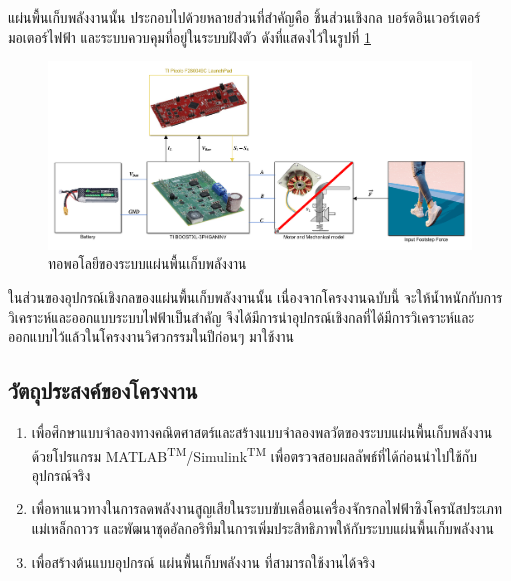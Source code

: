 \documentclass[11pt,a4paper]{article}
\begin{document}
แผ่นพื้นเก็บพลังงานนั้น ประกอบไปด้วยหลายส่วนที่สำคัญคือ ชิ้นส่วนเชิงกล บอร์ดอินเวอร์เตอร์ มอเตอร์ไฟฟ้า และระบบควบคุมที่อยู่ในระบบฝังตัว ดังที่แสดงไว้ในรูปที่ \ref{genpathtopology}
\begin{figure}[!h]
    \centering
    \includegraphics[width=\textwidth]{genpath_topology.png}
    \caption{ทอพอโลยีของระบบแผ่นพื้นเก็บพลังงาน}
    \label{genpathtopology}
\end{figure}

ในส่วนของอุปกรณ์เชิงกลของแผ่นพื้นเก็บพลังงานนั้น เนื่องจากโครงงานฉบับนี้ จะให้น้ำหนักกับการวิเคราะห์และออกแบบระบบไฟฟ้าเป็นสำคัญ จึงได้มีการนำอุปกรณ์เชิงกลที่ได้มีการวิเคราะห์และออกแบบไว้แล้วในโครงงานวิศวกรรมในปีก่อนๆ \cite{GpH:01} มาใช้งาน

\subsection{วัตถุประสงค์ของโครงงาน}
\begin{enumerate}
    \item เพื่อศึกษาแบบจำลองทางคณิตศาสตร์และสร้างแบบจำลองพลวัตของระบบแผ่นพื้นเก็บพลังงานด้วยโปรแกรม MATLAB\textsuperscript{TM}/Simulink\textsuperscript{TM} เพื่อตรวจสอบผลลัพธ์ที่ได้ก่อนนำไปใช้กับอุปกรณ์จริง
    \item เพื่อหาแนวทางในการลดพลังงานสูญเสียในระบบขับเคลื่อนเครื่องจักรกลไฟฟ้าซิงโครนัสประเภทแม่เหล็กถาวร และพัฒนาชุดอัลกอริทึมในการเพิ่มประสิทธิภาพให้กับระบบแผ่นพื้นเก็บพลังงาน
    \item เพื่อสร้างต้นแบบอุปกรณ์ แผ่นพื้นเก็บพลังงาน ที่สามารถใช้งานได้จริง

\end{enumerate}
\end{document}
